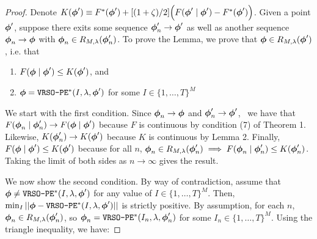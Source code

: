 \begin{proof}
     Denote $K(\boldsymbol{\phi}') \equiv F^*(\boldsymbol{\phi}') + [(1 + \zeta)/2] \Big(F(\boldsymbol{\phi}' \mid \boldsymbol{\phi}') - F^*(\boldsymbol{\phi}') \Big)$. Given a point $\boldsymbol{\phi}'$, suppose there exits some sequence $\boldsymbol{\phi}'_{n} \to \boldsymbol{\phi}'$ as well as another sequence $\boldsymbol{\phi}_{n} \to \boldsymbol{\phi}$ with $\boldsymbol{\phi}_{n} \in R_{M,\lambda}(\boldsymbol{\phi}'_{n})$. To prove the Lemma, we prove that $\boldsymbol{\phi} \in R_{M,\lambda}(\boldsymbol{\phi}')$, i.e. that
    \begin{enumerate}
        \item $F(\boldsymbol{\phi} \mid \boldsymbol{\phi}') \leq K(\boldsymbol{\phi}')$, and
        \item $\boldsymbol{\phi} = \texttt{VRSO-PE}^*(I,\lambda,\boldsymbol{\phi}')$ for some $I \in \{1,\ldots,T\}^M$
    \end{enumerate}
    We start with the first condition. Since $\boldsymbol{\phi}_{n} \to \boldsymbol{\phi}$ and $\boldsymbol{\phi}'_{n} \to \boldsymbol{\phi}'$,  \ we have that $F(\boldsymbol{\phi}_{n} \mid \boldsymbol{\phi}'_{n}) \to F(\boldsymbol{\phi} \mid \boldsymbol{\phi}')$ because $F$ is continuous by condition (7) of Theorem 1. Likewise, $K(\boldsymbol{\phi}'_{n}) \to K(\boldsymbol{\phi}')$ because $K$ is continuous by Lemma 2. Finally, $F(\boldsymbol{\phi} \mid \boldsymbol{\phi}') \leq K(\boldsymbol{\phi}')$ because for all $n$, $\boldsymbol{\phi}_n \in R_{M,\lambda}(\boldsymbol{\phi}_n') \implies F(\boldsymbol{\phi}_{n} \mid \boldsymbol{\phi}'_{n}) \leq K(\boldsymbol{\phi}'_{n})$. Taking the limit of both sides as $n \to \infty$ gives the result.
    
    We now show the second condition. By way of contradiction, assume that $\boldsymbol{\phi} \neq \texttt{VRSO-PE}^*(I,\lambda,\boldsymbol{\phi}')$ for any value of $I \in \{1,\ldots,T\}^M$. Then, $\min_I ||\boldsymbol{\phi} - \texttt{VRSO-PE}^*(I,\lambda,\boldsymbol{\phi}')||$ is strictly positive. 
    By assumption, for each $n$, $\boldsymbol{\phi}_{n} \in R_{M,\lambda}(\boldsymbol{\phi}'_{n})$, so $\boldsymbol{\phi}_{n} = \texttt{VRSO-PE}^*(I_n,\lambda,\boldsymbol{\phi}'_{n})$ for some $I_n \in \{1,\ldots,T\}^M$. %
    Using the triangle inequality, we have:


\end{proof}
